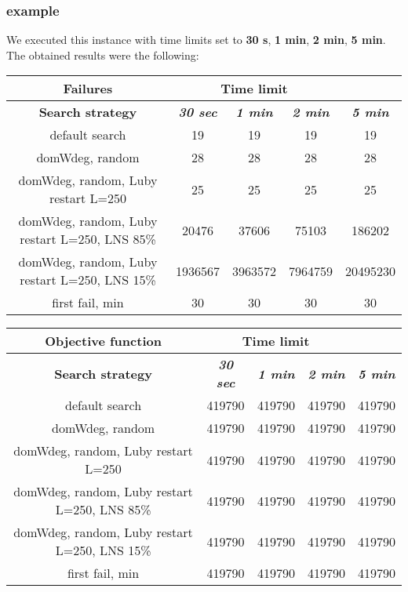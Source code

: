 \subsubsection{example}
We executed this instance with time limits set to \textbf{30 s}, \textbf{1 min}, \textbf{2 min}, \textbf{5 min}.\\
The obtained results were the following:
{
\renewcommand{\arraystretch}{2}
\begin{longtable}[h]{| c | c | c | c | c |}
    \hline
    \textbf{Failures} & \multicolumn{3}{c}{Time limit} & \\
    \hline
    \textbf{Search strategy} & \textbf{\textit{30 sec}} & \textbf{\textit{1 min}} & \textbf{\textit{2 min}} & \textbf{\textit{5 min}} \\
    \hline
    \endhead
    default search                                &      19 &      19 &      19 &       19 \\
    \hline
    domWdeg, random                               &      28 &      28 &      28 &       28 \\
    \hline
    domWdeg, random, Luby restart L=250           &      25 &      25 &      25 &       25 \\
    \hline
    domWdeg, random, Luby restart L=250, LNS 85\% &   20476 &   37606 &   75103 &   186202 \\
    \hline
    domWdeg, random, Luby restart L=250, LNS 15\% & 1936567 & 3963572 & 7964759 & 20495230 \\
    \hline
    first fail, min                               &      30 &      30 &      30 &       30 \\
    \hline
\end{longtable}
}

{
\renewcommand{\arraystretch}{2}
\begin{longtable}[h]{| c | c | c | c | c |}
    \hline
    \textbf{Objective function} & \multicolumn{3}{c}{Time limit} & \\
    \hline
    \textbf{Search strategy} & \textbf{\textit{30 sec}} & \textbf{\textit{1 min}} & \textbf{\textit{2 min}} & \textbf{\textit{5 min}} \\
    \hline
    \endhead
    default search                                & 419790 & 419790 & 419790 & 419790 \\
    \hline
    domWdeg, random                               & 419790 & 419790 & 419790 & 419790 \\
    \hline
    domWdeg, random, Luby restart L=250           & 419790 & 419790 & 419790 & 419790 \\
    \hline
    domWdeg, random, Luby restart L=250, LNS 85\% & 419790 & 419790 & 419790 & 419790 \\
    \hline
    domWdeg, random, Luby restart L=250, LNS 15\% & 419790 & 419790 & 419790 & 419790 \\
    \hline
    first fail, min                               & 419790 & 419790 & 419790 & 419790 \\
    \hline
\end{longtable}
}
